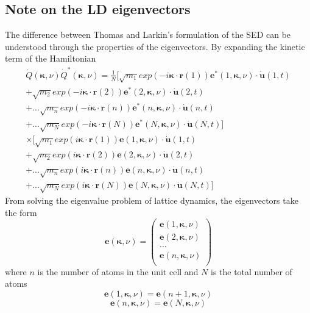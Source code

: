 \documentclass[aps,prb,preprint,preprintnumbers,amsmath,amssymb,floatfix,superscriptaddress]{revtex4}
\begin{document}
\subsection*{Note on the LD eigenvectors}
The difference between Thomas and Larkin's formulation of the SED can be understood through the properties of the eigenvectors. By expanding the kinetic term of the Hamiltonian
\begin{equation}
\begin{split}
\dot{Q}(\pmb{\kappa},\nu)\dot{Q}^*(\pmb{\kappa},\nu)=\frac{1}{N}[\sqrt{m_1}exp(-i\pmb{\kappa}\cdot\pmb{r}(1))\pmb{e}^*(1,\pmb{\kappa},\nu)\cdot\dot{\pmb{u}}(1,t)\\
+\sqrt{m_2}exp(-i\pmb{\kappa}\cdot\pmb{r}(2))\pmb{e}^*(2,\pmb{\kappa},\nu)\cdot\dot{\pmb{u}}(2,t)\\
+...\sqrt{m_n}exp(-i\pmb{\kappa}\cdot\pmb{r}(n))\pmb{e}^*(n,\pmb{\kappa},\nu)\cdot\dot{\pmb{u}}(n,t)\\
+...\sqrt{m_N}exp(-i\pmb{\kappa}\cdot\pmb{r}(N))\pmb{e}^*(N,\pmb{\kappa},\nu)\cdot\dot{\pmb{u}}(N,t)]\\
\times[\sqrt{m_1}exp(i\pmb{\kappa}\cdot\pmb{r}(1))\pmb{e}(1,\pmb{\kappa},\nu)\cdot\dot{\pmb{u}}(1,t)\\
+\sqrt{m_2}exp(i\pmb{\kappa}\cdot\pmb{r}(2))\pmb{e}(2,\pmb{\kappa},\nu)\cdot\dot{\pmb{u}}(2,t)\\
+...\sqrt{m_n}exp(i\pmb{\kappa}\cdot\pmb{r}(n))\pmb{e}(n,\pmb{\kappa},\nu)\cdot\dot{\pmb{u}}(n,t)\\
+...\sqrt{m_N}exp(i\pmb{\kappa}\cdot\pmb{r}(N))\pmb{e}(N,\pmb{\kappa},\nu)\cdot\dot{\pmb{u}}(N,t)]
\end{split}
\end{equation}
From solving the eigenvalue problem of lattice dynamics, the eigenvectors take the form
\[
\pmb{e}(\pmb{\kappa},\nu)=
\begin{pmatrix}
\pmb{e}(1,\pmb{\kappa},\nu)\\
\pmb{e}(2,\pmb{\kappa},\nu)\\
...\\
\pmb{e}(n,\pmb{\kappa},\nu)\\
\end{pmatrix}
\]
where $n$ is the number of atoms in the unit cell and $N$ is the total number of atoms
\begin{equation}
\pmb{e}(1,\pmb{\kappa},\nu)=\pmb{e}(n+1,\pmb{\kappa},\nu)
\end{equation}
\begin{equation}
\pmb{e}(n,\pmb{\kappa},\nu)=\pmb{e}(N,\pmb{\kappa},\nu)
\end{equation}
\end{document}
